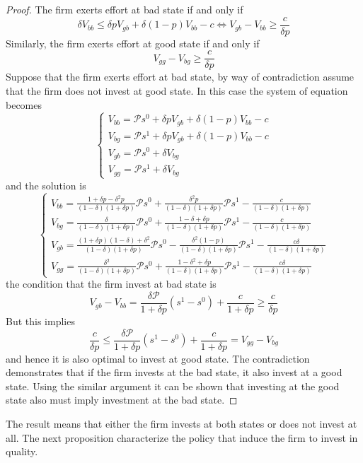 \documentclass[a4paper]{article}
\begin{document}
\begin{proof}
	
	The firm exerts effort at bad state if and only if $$\delta V_{bb} \le \delta p V_{gb} + \delta (1-p)V_{bb} - c \iff V_{gb} - V_{bb} \ge \frac{c}{\delta p}$$
	Similarly, the firm exerts effort at good state if and only if $$V_{gg} - V_{bg} \ge \frac{c}{\delta p}$$ Suppose that the firm exerts effort at bad state, by way of contradiction assume that the firm does not invest at good state. In this case the system of equation becomes
	$$	\begin{cases}
	V_{bb} = \mathcal{P}s^0 + \delta p V_{gb} + \delta (1-p)V_{bb} - c\\
	V_{bg} = \mathcal{P}s^1 + \delta p V_{gb} + \delta (1-p)V_{bb} - c\\
	V_{gb} = \mathcal{P}s^0 + \delta V_{bg}\\
	V_{gg} = \mathcal{P}s^1 + \delta V_{bg}
	\end{cases}$$ and the solution is $$\begin{cases}
	V_{bb} = \frac{1+\delta p - \delta^2p}{(1-\delta)(1+\delta p)}\mathcal{P}s^0 + \frac{\delta^2 p}{(1-\delta)(1+\delta p)}\mathcal{P}s^1 - \frac{c}{(1-\delta)(1+\delta p)}\\
	V_{bg} = \frac{\delta}{(1-\delta)(1+\delta p)}\mathcal{P}s^0 + \frac{1-\delta + \delta p}{(1-\delta)(1+\delta p)}\mathcal{P}s^1 - \frac{c}{(1-\delta)(1+\delta p)}\\
	V_{gb} = \frac{(1+\delta p)(1-\delta)+\delta^2}{(1-\delta)(1+\delta p)}\mathcal{P}s^0 - \frac{\delta^2(1-p)}{(1-\delta)(1+\delta p)}\mathcal{P}s^1 - \frac{c \delta}{(1-\delta)(1+\delta p)}\\
	V_{gg} = \frac{\delta^2}{(1-\delta)(1+\delta p)}\mathcal{P}s^0 + \frac{1 - \delta^2 + \delta p}{(1-\delta)(1+\delta p)}\mathcal{P}s^1 - \frac{c\delta}{(1-\delta)(1+\delta p)}
	\end{cases}$$
	the condition that the firm invest at bad state is
	$$V_{gb} - V_{bb} = \frac{\delta\mathcal{P}}{1+\delta p}(s^1 - s^0) + \frac{c}{1+\delta p} \ge \frac{c}{\delta p}$$
	But this implies
	$$\frac{c}{\delta p} \le \frac{\delta\mathcal{P}}{1 + \delta p}(s^1 - s^0) + \frac{c}{1 + \delta p} = V_{gg} - V_{bg}$$ and hence it is also optimal to invest at good state. The contradiction demonstrates that if the firm invests at the bad state, it also invest at a good state. Using the similar argument it can be shown that investing at the good state also must imply investment at the bad state.
\end{proof}
The result means that either the firm invests at both states or does not invest at all.
The next proposition characterize the policy that induce the firm to invest in quality.
\end{document}
